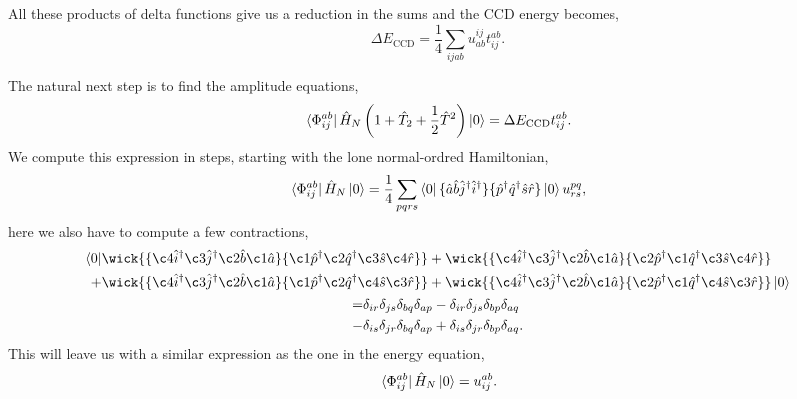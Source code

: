All these products of delta functions give us a reduction in the sums and the CCD
energy becomes,
\begin{equation}
    \Delta E_{\text{CCD}} = \frac{1}{4}\sum_{ijab} u^{ij}_{ab} t^{ab}_{ij}.
\end{equation}

The natural next step is to find the amplitude equations,
\begin{equation}
    \bra*{\Phi^{ab}_{ij}}\hat{H}_N\left(1 + \hat{T}_2 + \frac{1}{2}\hat{T}^2\right) \ket{0}
        = \Delta E_{\text{CCD}} t^{ab}_{ij}.
\end{equation}
We compute this expression in steps, starting with the lone normal-ordred Hamiltonian,
\begin{equation}
    \bra*{\Phi^{ab}_{ij}} \hat{H}_N \ket{0}
        = \frac{1}{4}\sum_{pqrs} \bra{0}
        \{\hat{a}\hat{b}\hat{j}^\dagger\hat{i}^\dagger\}
        \{\hat{p}^\dagger\hat{q}^\dagger\hat{s}\hat{r}\}
        \ket{0} u^{pq}_{rs},
\end{equation}
here we also have to compute a few contractions,
\begin{gather}
    \begin{aligned}
        \bra{0}
        &\wick{
        \{ \c4{\hat{i}}^\dagger \c3{\hat{j}}^\dagger \c2{\hat{b}} \c1{\hat{a}}\}
        \{ \c1{\hat{p}}^\dagger \c2{\hat{q}}^\dagger \c3{\hat{s}} \c4{\hat{r}} \}
        }
        +\wick{
        \{ \c4{\hat{i}}^\dagger \c3{\hat{j}}^\dagger \c2{\hat{b}} \c1{\hat{a}}\}
        \{ \c2{\hat{p}}^\dagger \c1{\hat{q}}^\dagger \c3{\hat{s}} \c4{\hat{r}} \}
        } \\
        +&\wick{
        \{ \c4{\hat{i}}^\dagger \c3{\hat{j}}^\dagger \c2{\hat{b}} \c1{\hat{a}}\}
        \{ \c1{\hat{p}}^\dagger \c2{\hat{q}}^\dagger \c4{\hat{s}} \c3{\hat{r}} \}
        }
        +\wick{
        \{ \c4{\hat{i}}^\dagger \c3{\hat{j}}^\dagger \c2{\hat{b}} \c1{\hat{a}}\}
        \{ \c2{\hat{p}}^\dagger \c1{\hat{q}}^\dagger \c4{\hat{s}} \c3{\hat{r}} \}
        }
        \ket{0}
    \end{aligned} \\
    \begin{aligned}
        =&\delta_{ir}\delta_{js}\delta_{bq}\delta_{ap} 
        -\delta_{ir}\delta_{js}\delta_{bp}\delta_{aq}\\
        -&\delta_{is}\delta_{jr}\delta_{bq}\delta_{ap}
        +\delta_{is}\delta_{jr}\delta_{bp}\delta_{aq}.
    \end{aligned} 
\end{gather}
This will leave us with a similar expression as the one in the energy equation,
\begin{equation}
    \bra*{\Phi^{ab}_{ij}} \hat{H}_N \ket{0} = u^{ab}_{ij}.
\end{equation}

